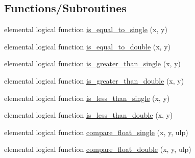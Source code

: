 \subsection*{Functions/\+Subroutines}
\begin{DoxyCompactItemize}
\item 
elemental logical function \hyperlink{namespacem__compare__float__numbers_a77dbaa3c42872d0366a3c5c2d99664d2}{is\+\_\+equal\+\_\+to\+\_\+single} (x, y)
\item 
elemental logical function \hyperlink{namespacem__compare__float__numbers_a086e7c43d2dca1f8238afd6548e2704e}{is\+\_\+equal\+\_\+to\+\_\+double} (x, y)
\item 
elemental logical function \hyperlink{namespacem__compare__float__numbers_ab525ef9c044e5187643e04c64d470186}{is\+\_\+greater\+\_\+than\+\_\+single} (x, y)
\item 
elemental logical function \hyperlink{namespacem__compare__float__numbers_ac0b7c9aeec5a785ebff7a6e59ba5fb26}{is\+\_\+greater\+\_\+than\+\_\+double} (x, y)
\item 
elemental logical function \hyperlink{namespacem__compare__float__numbers_a82b07d4a5f9076d2dc0655c8733549b5}{is\+\_\+less\+\_\+than\+\_\+single} (x, y)
\item 
elemental logical function \hyperlink{namespacem__compare__float__numbers_a36578a1fa0cf4ee3d29ded529dbd156c}{is\+\_\+less\+\_\+than\+\_\+double} (x, y)
\item 
elemental logical function \hyperlink{namespacem__compare__float__numbers_a5f413c6822015914ba48d10503f2bb0f}{compare\+\_\+float\+\_\+single} (x, y, ulp)
\item 
elemental logical function \hyperlink{namespacem__compare__float__numbers_a041bd26aef7f9bbc8eb88b2f39e7755a}{compare\+\_\+float\+\_\+double} (x, y, ulp)
\end{DoxyCompactItemize}
